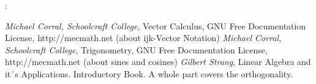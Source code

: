 \documentclass{article}
\begin{document}
:\\

\begin{thebibliography}
    \bibitem{[Corr09]} \textit{Michael Corral, Schoolcraft College},
		    Vector Calculus, GNU Free Documentation License, http://mecmath.net (about ijk-Vector Notation) 
    \bibitem{[Corr09]} \textit{Michael Corral, Schoolcraft College},
		    Trigonometry, GNU Free Documentation License, http://mecmath.net (about sines and cosines)
    \bibitem{[Strang]} \textit{Gilbert Strang},
		    Linear Algebra and it´s Applications. Introductory Book. A whole part covers the orthogonality.
\end{thebibliography}

\printindex
\end{document}
